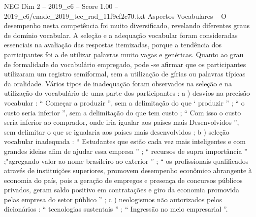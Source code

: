 \begin{textsample}{NEG Dim 2 – 2019\_c6 – Score 1.00 – 2019\_c6/enade\_2019\_tec\_rad\_11f9cf2c70.txt}
Aspectos Vocabulares – O desempenho nesta competência foi muito diversificado, revelando diferentes graus de domínio vocabular.
A seleção e a adequação vocabular foram consideradas essenciais na avaliação das respostas itemizadas, porque a tendência dos participantes foi a de utilizar palavras muito vagas e genéricas.
Quanto ao grau de formalidade do vocabulário empregado, pode -se afirmar que os participantes utilizaram um registro semiformal, sem a utilização de gírias ou palavras típicas da oralidade.
Vários tipos de inadequação foram observados na seleção e na utilização do vocabulário de uma parte dos participantes : a ) desvios na precisão vocabular : “ Começar a produzir ”, sem a delimitação do que ‘ produzir ” ; “ o custo seria inferior ”, sem a delimitação do que tem custo ; “ Com isso o custo seria inferior ao comprador, onde iria igualar aos países mais Desenvolvidos ”, sem delimitar o que se igualaria aos países mais desenvolvidos ; b ) seleção vocabular inadequada : “ Estudantes que estão cada vez mais inteligentes e com grandes ideias afim de ajudar essa empresa ” ; “ recursos de supra importância ” ;"agregando valor ao nome brasileiro ao exterior ” ; “ os profissionais qualificados através de instituições superiores, promovem desempenho econômico abrangente à economia do país, pois a geração de empregos e presença de concursos públicos privados, geram saldo positivo em contratações e giro da economia promovida pelas empresa do setor público ” ; c ) neologismos não autorizados pelos dicionários : “ tecnologias sustentais ” ; “ Ingressão no meio empresarial ”.

\end{textsample}
